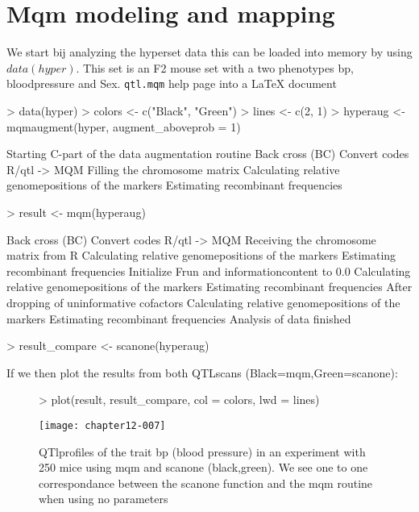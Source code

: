 \documentclass[11pt]{article}
\begin{document}
\section{Mqm modeling and mapping}
We start bij analyzing the hyperset data this can be loaded into memory by using $data(hyper)$. This set is an F2 mouse set with a two phenotypes bp, bloodpressure and Sex. \texttt{qtl.mqm} help page into a \LaTeX{} document
\\
\begin{Schunk}
\begin{Sinput}
> data(hyper)
> colors <- c("Black", "Green")
> lines <- c(2, 1)
> hyperaug <- mqmaugment(hyper, augment_aboveprob = 1)
\end{Sinput}
\begin{Soutput}
Starting C-part of the data augmentation routine
Back cross (BC)
Convert codes R/qtl -> MQM
Filling the chromosome matrix
Calculating relative genomepositions of the markers
Estimating recombinant frequencies
\end{Soutput}
\begin{Sinput}
> result <- mqm(hyperaug)
\end{Sinput}
\begin{Soutput}
Back cross (BC)
Convert codes R/qtl -> MQM
Receiving the chromosome matrix from R
Calculating relative genomepositions of the markers
Estimating recombinant frequencies
Initialize Frun and informationcontent to 0.0
Calculating relative genomepositions of the markers
Estimating recombinant frequencies
After dropping of uninformative cofactors
Calculating relative genomepositions of the markers
Estimating recombinant frequencies
Analysis of data finished
\end{Soutput}
\begin{Sinput}
> result_compare <- scanone(hyperaug)
\end{Sinput}
\end{Schunk}
If we then plot the results from both QTLscans (Black=mqm,Green=scanone):
\begin{figure}[ht]
\begin{Schunk}
\begin{Sinput}
> plot(result, result_compare, col = colors, lwd = lines)
\end{Sinput}
\end{Schunk}
\texttt{[image: chapter12-007]}
\caption{QTlprofiles of the trait bp (blood pressure) in an experiment with 250 mice using mqm and scanone (black,green). We see one to 
one correspondance between the scanone function and the mqm routine when using no parameters}
\end{figure}
\end{document}
